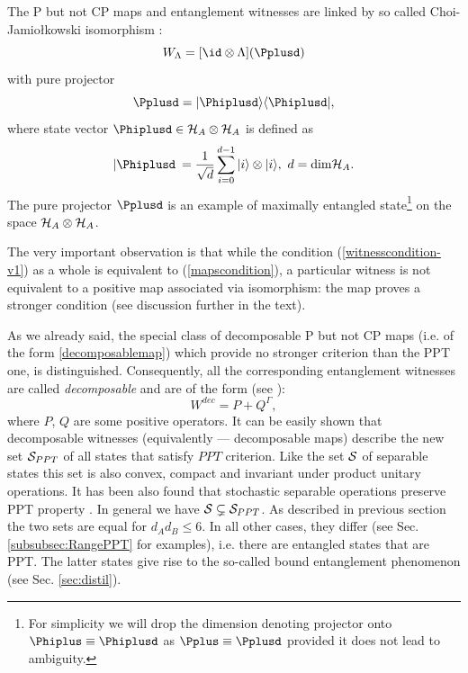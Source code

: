 \documentclass[rmp,12pt,preprint]{revtex4-2}
\begin{document}
The P but not CP maps and entanglement witnesses are linked by so
called Choi-Jamio\l{}kowski isomorphism \cite{Jamiolkowski,Choi82}:
\begin{equation}
W_{\Lambda}=[\id \otimes \Lambda](\Pplusd) \label{isomorphism}
\end{equation}
with pure projector
\begin{equation}
\Pplusd=|\Phiplusd \rangle \langle \Phiplusd|,
\label{MaximallyEntangledProjector}
\end{equation}
where state vector $\Phiplusd\in {\cal H}_{A} \otimes {\cal
  H}_{A}$ is defined as
\begin{equation}
|\Phiplusd\>={1\over \sqrt{d}}\sum_{i=0}^{d-1} |i\rangle \otimes |i\rangle, \
d=\mathrm{dim} {\cal H}_{A}. \label{MaximallyEntangledVector}
\end{equation}
The pure projector $\Pplusd$ is an example of maximally entangled
state\footnote{For simplicity we will drop the dimension denoting
  projector onto $\Phiplus\equiv \Phiplusd$ as $\Pplus\equiv \Pplusd$
  provided it does not lead to ambiguity.} on the space ${\cal H}_{A}
\otimes {\cal H}_{A}$.

The very important observation is that while the condition
(\ref{witnesscondition-v1}) as a whole is equivalent to
(\ref{mapscondition}), a particular witness is not equivalent to a
positive map associated via isomorphism: the map proves a stronger
condition (see discussion further in the text).

As we already said, the special class of decomposable P but not CP
maps (i.e. of the form \ref{decomposablemap}) which provide no
stronger criterion than the PPT one, is distinguished. Consequently,
all the corresponding entanglement witnesses are called {\it
  decomposable} and are of the form (see \cite{Lewenstein00a}):
\begin{equation}
W^{dec}=P+Q^{\Gamma},
\label{eq:dec_witness}
\end{equation}
where $P$, $Q$ are some positive operators. It can be easily shown
that decomposable witnesses (equivalently --- decomposable maps)
describe the new set ${\cal S}_{PPT}$ of all states that satisfy $PPT$
criterion. Like the set ${\cal S}$ of separable states this set is
also convex, compact and invariant under product unitary operations.
It has been also found that stochastic separable operations preserve
PPT property \cite{bound}. In general we have ${\cal S} \subsetneq
{\cal S}_{PPT}$. As described in previous section the two sets are
equal for $d_{A}d_{B} \leq 6$. In all other cases, they differ
\cite{Pawel97} (see Sec. \ref{subsubsec:RangePPT} for examples),
i.e. there are entangled states that are PPT. The latter states give
rise to the so-called bound entanglement phenomenon (see Sec.
\ref{sec:distil}).
\end{document}
